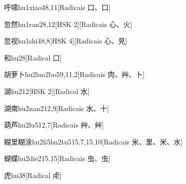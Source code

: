 \begin{entry}{呼啸}{hu1xiao4}{8,11}[Radicais ⼝、⼝]
\end{entry}

\begin{entry}{忽然}{hu1ran2}{8,12}[HSK 2][Radicais ⼼、⽕]
\end{entry}

\begin{entry}{忽视}{hu1shi4}{8,8}[HSK 4][Radicais ⼼、⾒]
\end{entry}

\begin{entry}{和}{hu2}{8}[Radical ⼝]
\end{entry}

\begin{entry}{胡萝卜}{hu2luo2bo5}{9,11,2}[Radicais ⾁、⾋、⼘]
\end{entry}

\begin{entry}{湖}{hu2}{12}[HSK 2][Radical ⽔]
\end{entry}

\begin{entry}{湖南}{hu2nan2}{12,9}[Radicais ⽔、⼗]
\end{entry}

\begin{entry}{葫芦}{hu2lu5}{12,7}[Radicais ⾋、⾋]
\end{entry}

\begin{entry}{糊里糊涂}{hu2li5hu2tu5}{15,7,15,10}[Radicais ⽶、⾥、⽶、⽔]
\end{entry}

\begin{entry}{蝴蝶}{hu2die2}{15,15}[Radicais ⾍、⾍]
\end{entry}

\begin{entry}{虎}{hu3}{8}[Radical ⾌]
\end{entry}

